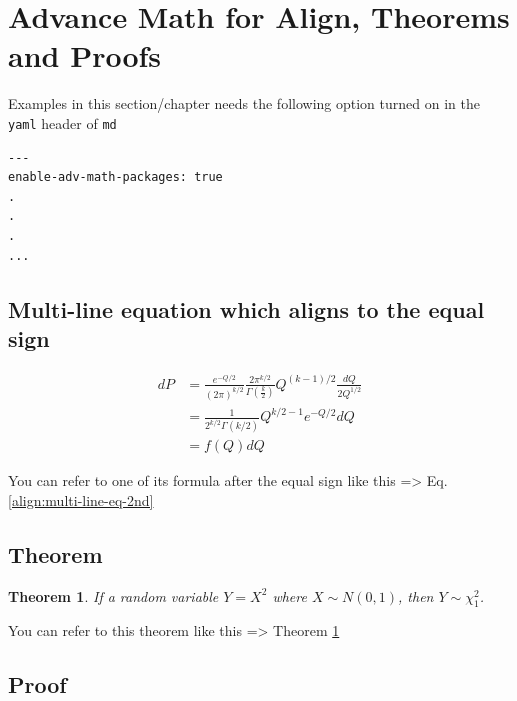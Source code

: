 \documentclass[10pt, a4paper, oneside]{article}
\newtheorem{theorem}{Theorem} %
\begin{document}
\section{Advance Math for Align, Theorems and Proofs}\label{advance-math-for-align-theorems-and-proofs}

Examples in this section/chapter needs
the following option turned on in the \texttt{yaml} header of \texttt{md}

\begin{verbatim}
---
enable-adv-math-packages: true
.
.
.
...
\end{verbatim}

\subsection{Multi-line equation which aligns to the equal sign}\label{multi-line-equation-which-aligns-to-the-equal-sign}

\begin{align}
dP &= \frac{e^{-Q/2}}{(2\pi)^{k/2}}\frac{2\pi^{k/2}}{\Gamma(\frac{k}{2})}Q^{(k-1)/2}\frac{dQ}{2Q^{1/2}} \nonumber \\
   &= \frac{1}{2^{k/2}\Gamma(k/2)}Q^{k/2 - 1}e^{-Q/2}dQ \label{align:multi-line-eq-2nd} \\
   &= f(Q)dQ \label{align:multi-line-eq-3rd}
\end{align}

You can refer to one of its formula after the equal sign like this =\textgreater{} Eq. \ref{align:multi-line-eq-2nd}

\subsection{Theorem}\label{theorem}

\begin{theorem}\label{thm:X-2-chi}
If a random variable $Y = X^{2}$ where $X \sim N(0,1)$,
then $Y  \sim \chi^{2}_{1}$.
\end{theorem}

You can refer to this theorem like this =\textgreater{} Theorem \ref{thm:X-2-chi}

\subsection{Proof}\label{proof}
\end{document}
